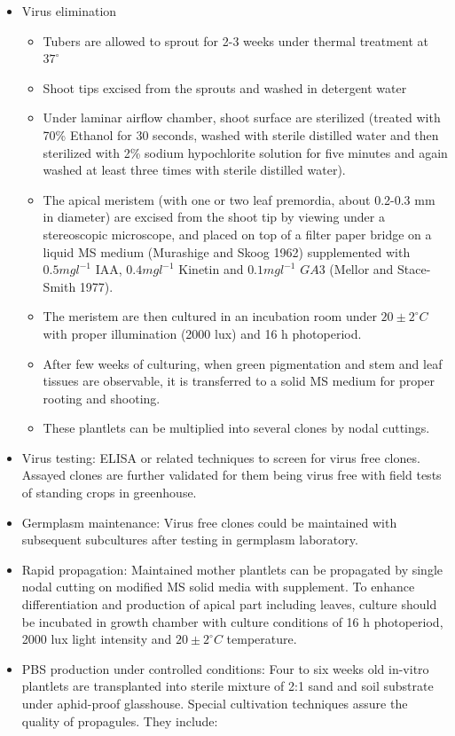 \documentclass[
  openany]{book}
\providecommand{\tightlist}{%
  \setlength{\itemsep}{0pt}\setlength{\parskip}{0pt}}
\begin{document}
\begin{itemize}
\tightlist
\item
  Virus elimination

  \begin{itemize}
  \tightlist
  \item
    Tubers are allowed to sprout for 2-3 weeks under thermal treatment at \(37^\circ\)
  \item
    Shoot tips excised from the sprouts and washed in detergent water
  \item
    Under laminar airflow chamber, shoot surface are sterilized (treated with 70\% Ethanol for 30 seconds, washed with sterile distilled water and then sterilized with 2\% sodium hypochlorite solution for five minutes and again washed at least three times with sterile distilled water).
  \item
    The apical meristem (with one or two leaf premordia, about 0.2-0.3 mm in diameter) are excised from the shoot tip by viewing under a stereoscopic microscope, and placed on top of a filter paper bridge on a liquid MS medium (Murashige and Skoog 1962) supplemented with \(0.5 mg l^{-1}\) IAA, \(0.4 mg l^{-1}\) Kinetin and \(0.1 mg l^{-1}\) \(GA 3\) (Mellor and Stace-Smith 1977).
  \item
    The meristem are then cultured in an incubation room under \(20\pm 2^\circ C\) with proper illumination (2000 lux) and 16 h photoperiod.
  \item
    After few weeks of culturing, when green pigmentation and stem and leaf tissues are observable, it is transferred to a solid MS medium for proper rooting and shooting.
  \item
    These plantlets can be multiplied into several clones by nodal cuttings.
  \end{itemize}
\item
  Virus testing: ELISA or related techniques to screen for virus free clones. Assayed clones are further validated for them being virus free with field tests of standing crops in greenhouse.
\item
  Germplasm maintenance: Virus free clones could be maintained with subsequent subcultures after testing in germplasm laboratory.
\item
  Rapid propagation: Maintained mother plantlets can be propagated by single nodal cutting on modified MS solid media with supplement. To enhance differentiation and production of apical part including leaves, culture should be incubated in growth chamber with culture conditions of 16 h photoperiod, 2000 lux light intensity and \(20 \pm 2^\circ C\) temperature.
\item
  PBS production under controlled conditions: Four to six weeks old in-vitro plantlets are transplanted into sterile mixture of 2:1 sand and soil substrate under aphid-proof glasshouse. Special cultivation techniques assure the quality of propagules. They include:


\end{itemize}
\end{document}
